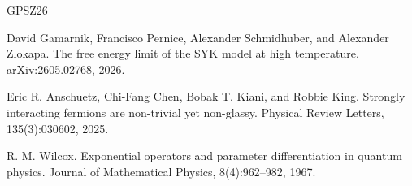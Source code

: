 \documentclass[11pt]{article}
\begin{document}
\begin{thebibliography}{GPSZ26}

David Gamarnik, Francisco Pernice, Alexander Schmidhuber, and Alexander
Zlokapa.
\newblock The free energy limit of the {SYK} model at high temperature.
\newblock arXiv:2605.02768, 2026.

Eric R. Anschuetz, Chi-Fang Chen, Bobak T. Kiani, and Robbie King.
\newblock Strongly interacting fermions are non-trivial yet non-glassy.
\newblock Physical Review Letters, 135(3):030602, 2025.

R. M. Wilcox.
\newblock Exponential operators and parameter differentiation in quantum physics.
\newblock Journal of Mathematical Physics, 8(4):962--982, 1967.

\end{thebibliography}
\end{document}
